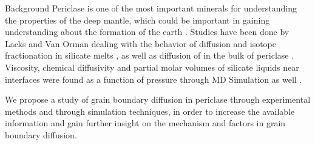 \documentclass{article}
\begin{document}
\begin{section}{Background}
	Periclase is one of the most important minerals for understanding the properties of the deep mantle, which could be important in gaining understanding about the formation of the earth \cite{MantleFirstPrinciplesNature}. Studies have been done by Lacks and Van Orman dealing with the behavior of diffusion and isotope fractionation in silicate melts \cite{MeltThermalDiffusion}, as well as diffusion of  in the bulk of periclase \cite{DiffusionAlPericlase}. Viscosity, chemical diffusivity and partial molar volumes of silicate liquids near interfaces were found as a function of pressure through MD Simulation as well \cite{MDLiquidJoins}. 

	We propose a study of grain boundary diffusion in periclase through experimental methods and through simulation techniques, in order to increase the available information and gain further insight on the mechanism and factors in grain boundary diffusion.



\end{section}


%
%
%

  
  
\end{document}
